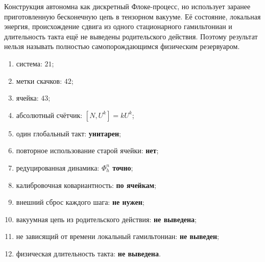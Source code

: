 \begin{nogocriterion}
Конструкция автономна как дискретный Флоке-процесс, но использует заранее
приготовленную бесконечную цепь в тензорном вакууме. Её состояние, локальная
энергия, происхождение сдвига из одного стационарного гамильтониан и
длительность такта ещё не выведены родительского действия. Поэтому результат нельзя
называть полностью самопорождающимся физическим резервуаром.
\end{nogocriterion}

\begin{protocol}
\begin{enumerate}
 \item система: \textbf{$21$};
 \item метки скачков: \textbf{$42$};
 \item ячейка: \textbf{$43$};
 \item абсолютный счётчик: \textbf{$[N,U^k]=kU^k$};
 \item один глобальный такт: \textbf{унитарен};
 \item повторное использование старой ячейки: \textbf{нет};
 \item редуцированная динамика: \textbf{$\Phi_h^n$ точно};
 \item калибровочная ковариантность: \textbf{по ячейкам};
 \item внешний сброс каждого шага: \textbf{не нужен};
 \item вакуумная цепь из родительского действия: \textbf{не выведена};
 \item не зависящий от времени локальный гамильтониан: \textbf{не выведен};
 \item физическая длительность такта: \textbf{не выведена}.
\end{enumerate}
\end{protocol}